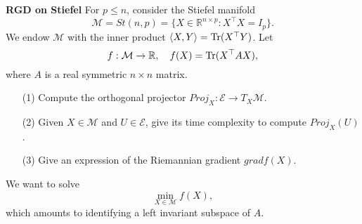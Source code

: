 \documentclass[en, oneside]{assignment}
\begin{document}
\begin{prob} \textbf{RGD on Stiefel}
    For $p \leq n$, consider the Stiefel manifold
    \begin{equation*}
        \mathcal{M} = St(n, p) = \{X \in \mathbb{R} ^{n \times p} : X ^\top X = I_p\}.
    \end{equation*}
    We endow $\mathcal{M}$ with the inner product $\langle X, Y \rangle = \operatorname{Tr} (X ^\top Y)$. Let
    \begin{equation*}
        f: \mathcal{M} \to \mathbb{R}, \quad f(X) = \operatorname{Tr} (X ^\top A X),
    \end{equation*}
    where $A$ is a real symmetric $n \times n$ matrix.
    \begin{itemize}
        \item[(1)] Compute the orthogonal projector $Proj _X: \mathcal{E} \to T _X \mathcal{M}$.
        \item[(2)] Given $X \in \mathcal{M}$ and $U \in \mathcal{E}$, give its time complexity to compute $Proj _X (U)$.
        \item[(3)] Give an expression of the Riemannian gradient $gradf(X)$.
    \end{itemize}
    We want to solve
    \begin{equation*}
        \min _{X \in \mathcal{M}} f(X),
    \end{equation*}
    which amounts to identifying a left invariant subspace of $A$.
\end{prob}
\end{document}
